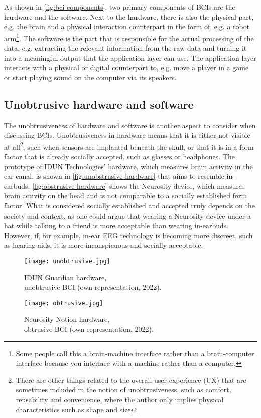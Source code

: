 As shown in \autoref{fig:bci-components}, two primary components of BCIs are the hardware and the software. Next to the hardware, there is also the physical part, e.g. the brain and a physical interaction counterpart in the form of, e.g. a robot arm\footnote{Some people call this a brain-machine interface rather than a brain-computer interface because you interface with a machine rather than a computer.}. The software is the part that is responsible for the actual processing of the data, e.g. extracting the relevant information from the raw data and turning it into a meaningful output that the application layer can use. The application layer interacts with a physical or digital counterpart to, e.g. move a player in a game or start playing sound on the computer via its speakers.

\subsection{Unobtrusive hardware and software}
\label{chapter2-unobtrusive-hardware-and-software}

The unobtrusiveness of hardware and software is another aspect to consider when discussing BCIs. Unobtrusiveness in hardware means that it is either not visible at all\footnote{There are other things related to the overall user experience (UX) that are sometimes included in the notion of unobtrusiveness, such as comfort, reusability and convenience, where the author only implies physical characteristics such as shape and size}, such when sensors are implanted beneath the skull, or that it is in a form factor that is already socially accepted, such as glasses or headphones. The prototype of IDUN Technologies' hardware, which measures brain activity in the ear canal, is shown in \autoref{fig:unobstrusive-hardware} that aims to resemble in-earbuds. \autoref{fig:obstrusive-hardware} shows the Neurosity device, which measures brain activity on the head and is not comparable to a socially established form factor. What is considered socially established and accepted truly depends on the society and context, as one could argue that wearing a Neurosity device under a hat while talking to a friend is more acceptable than wearing in-earbuds. However, if, for example, in-ear EEG technology is becoming more discreet, such as hearing aids, it is more inconspicuous and socially acceptable.

\begin{figure}[!htb]
  \texttt{[image: unobtrusive.jpg]}
  \caption{IDUN Guardian hardware, \\ unobtrusive BCI (own representation, 2022).}
  \label{fig:unobstrusive-hardware}
  \endminipage\hfill
  \texttt{[image: obtrusive.jpg]}
  \caption{Neurosity Notion hardware, \\ obtrusive BCI (own representation, 2022).}
  \label{fig:obstrusive-hardware}
  \endminipage\hfill
\end{figure}

